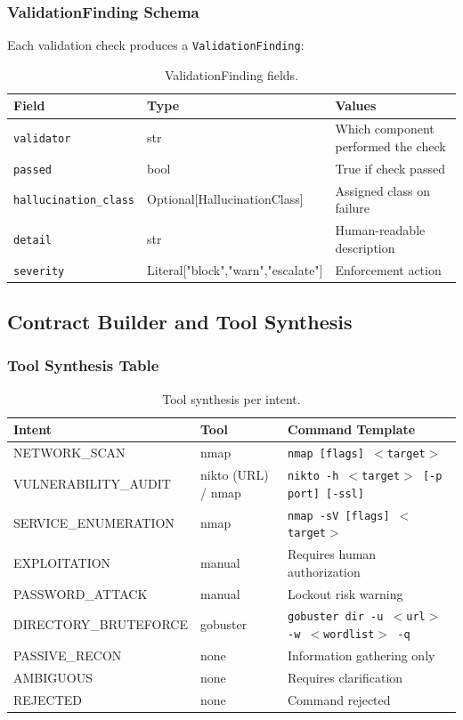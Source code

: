 \documentclass[10pt,journal,onecolumn]{IEEEtran}
\begin{document}
\subsubsection{ValidationFinding Schema}
Each validation check produces a \texttt{ValidationFinding}:
\begin{table}[t]
\caption{ValidationFinding fields.}
\label{tab:vf}
\begin{tabularx}{\textwidth}{>{\ttfamily}l l X}
\toprule
\textbf{Field} & \textbf{Type} & \textbf{Values}\\
\midrule
\texttt{validator} & str & Which component performed the check\\
\texttt{passed} & bool & True if check passed\\
\texttt{hallucination\_class} & Optional[HallucinationClass] & Assigned class on failure\\
\texttt{detail} & str & Human-readable description\\
\texttt{severity} & Literal["block","warn","escalate"] & Enforcement action\\
\bottomrule
\end{tabularx}
\end{table}

\subsection{Contract Builder and Tool Synthesis}

\subsubsection{Tool Synthesis Table}
\begin{table}[t]
\caption{Tool synthesis per intent.}
\label{tab:toolsynth}
\begin{tabularx}{\textwidth}{>{\ttfamily}l l X}
\toprule
\textbf{Intent} & \textbf{Tool} & \textbf{Command Template}\\
\midrule
NETWORK\_SCAN & nmap & \texttt{nmap [flags] $<$target$>$}\\
VULNERABILITY\_AUDIT & nikto (URL) / nmap & \texttt{nikto -h $<$target$>$ [-p port] [-ssl]}\\
SERVICE\_ENUMERATION & nmap & \texttt{nmap -sV [flags] $<$target$>$}\\
EXPLOITATION & manual & Requires human authorization\\
PASSWORD\_ATTACK & manual & Lockout risk warning\\
DIRECTORY\_BRUTEFORCE & gobuster & \texttt{gobuster dir -u $<$url$>$ -w $<$wordlist$>$ -q}\\
PASSIVE\_RECON & none & Information gathering only\\
AMBIGUOUS & none & Requires clarification\\
REJECTED & none & Command rejected\\
\bottomrule
\end{tabularx}
\end{table}
\end{document}
